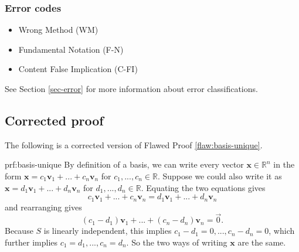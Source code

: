 \subsubsection{Error codes}
\begin{itemize}
	\item Wrong Method (WM)
	\item Fundamental Notation (F-N)
	\item Content False Implication (C-FI)
\end{itemize}
See Section \ref{sec-error} for more information about error classifications.

\clearpage
\subsection{Corrected proof}

The following is a corrected version of Flawed Proof \ref{flaw:basis-unique}.

\begin{prf}{prf:basis-unique}
By definition of a basis, we can write every vector $\bm{x} \in \mathbb{R}^n$ in the form $\bm{x} = c_1\bm{v}_1+ ...+ c_n\bm{v}_n$ for $c_1, ..., c_n \in \mathbb{R}$. Suppose we could also write it as $\bm{x} = d_1\bm{v}_1+ ...+ d_n\bm{v}_n$ for $d_1, ..., d_n \in \mathbb{R}$. Equating the two equations gives \[c_1\bm{v}_1+ ...+ c_n\bm{v}_n = d_1\bm{v}_1+ ...+ d_n\bm{v}_n\] and rearranging gives \[(c_1-d_1)\bm{v}_1+ ...+ (c_n-d_n)\bm{v}_n=\vec{0}.\] Because $S$ is linearly independent, this implies $c_1-d_1=0, ..., c_n-d_n=0$, which further implies $c_1 = d_1, ..., c_n=d_n$. So the two ways of writing $\bm{x}$ are the same.

\end{prf} 
